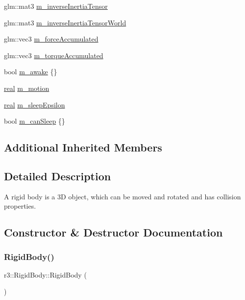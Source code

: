 \begin{DoxyCompactItemize}
glm\+::mat3 \mbox{\hyperlink{classr3_1_1_rigid_body_ac0a016d0e9d03e5365dd082eddb171fe}{m\+\_\+inverse\+Inertia\+Tensor}}
\item 
glm\+::mat3 \mbox{\hyperlink{classr3_1_1_rigid_body_a48c87824d37104f44cd190e7ff1159a9}{m\+\_\+inverse\+Inertia\+Tensor\+World}}
\item 
glm\+::vec3 \mbox{\hyperlink{classr3_1_1_rigid_body_a7d7ce53ed37502e4314766da7679b4cc}{m\+\_\+force\+Accumulated}}
\item 
glm\+::vec3 \mbox{\hyperlink{classr3_1_1_rigid_body_a51d3583c700e3bf071fce532a960bb98}{m\+\_\+torque\+Accumulated}}
\item 
bool \mbox{\hyperlink{classr3_1_1_rigid_body_abfcca5ae4caa68d23ba68cc4fd1d2d33}{m\+\_\+awake}} \{\}
\item 
\mbox{\hyperlink{namespacer3_ab2016b3e3f743fb735afce242f0dc1eb}{real}} \mbox{\hyperlink{classr3_1_1_rigid_body_a345902809f82c0d95a8c747d14bcee17}{m\+\_\+motion}}
\item 
\mbox{\hyperlink{namespacer3_ab2016b3e3f743fb735afce242f0dc1eb}{real}} \mbox{\hyperlink{classr3_1_1_rigid_body_a2becab957c58f4b306fedb692dcf5658}{m\+\_\+sleep\+Epsilon}}
\item 
bool \mbox{\hyperlink{classr3_1_1_rigid_body_ada1bb4c1c933c96090fe705612db5866}{m\+\_\+can\+Sleep}} \{\}
\end{DoxyCompactItemize}
\subsection*{Additional Inherited Members}


\subsection{Detailed Description}
A rigid body is a 3D object, which can be moved and rotated and has collision properties. 

\subsection{Constructor \& Destructor Documentation}
\mbox{\label{classr3_1_1_rigid_body_a8acb625440a10d83a87e9139bc9429d5}} 
\subsubsection{\texorpdfstring{Rigid\+Body()}{RigidBody()}\hspace{0.1cm}{\footnotesize\ttfamily [1/2]}}
{\footnotesize\ttfamily r3\+::\+Rigid\+Body\+::\+Rigid\+Body (\begin{DoxyParamCaption}{ }\end{DoxyParamCaption})\hspace{0.3cm}{\ttfamily [explicit]}}

